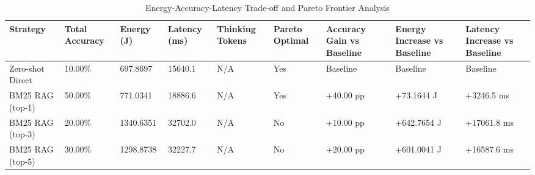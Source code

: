 \begin{table}
\caption{Energy-Accuracy-Latency Trade-off and Pareto Frontier Analysis}
\label{tab:tradeoff_comparison}
\begin{tabular}{lllllllll}
\toprule
Strategy & Total Accuracy & Energy (J) & Latency (ms) & Thinking Tokens & Pareto Optimal & Accuracy Gain vs Baseline & Energy Increase vs Baseline & Latency Increase vs Baseline \\
\midrule
Zero-shot Direct & 10.00\% & 697.8697 & 15640.1 & N/A & Yes & Baseline & Baseline & Baseline \\
BM25 RAG (top-1) & 50.00\% & 771.0341 & 18886.6 & N/A & Yes & +40.00 pp & +73.1644 J & +3246.5 ms \\
BM25 RAG (top-3) & 20.00\% & 1340.6351 & 32702.0 & N/A & No & +10.00 pp & +642.7654 J & +17061.8 ms \\
BM25 RAG (top-5) & 30.00\% & 1298.8738 & 32227.7 & N/A & No & +20.00 pp & +601.0041 J & +16587.6 ms \\
\bottomrule
\end{tabular}
\end{table}
